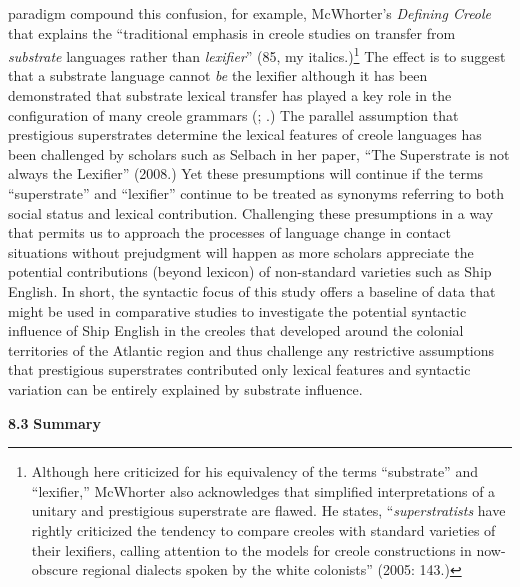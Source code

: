paradigm compound this confusion, for example, McWhorter’s \textit{Defining Creole}  that explains the “traditional emphasis in creole studies on transfer from \textit{substrate} languages rather than \textit{lexifier}” (85, my italics.)\footnote{Although here criticized for his equivalency of the terms “substrate” and “lexifier,” McWhorter also acknowledges that simplified interpretations of a unitary and prestigious superstrate are flawed. He states, “\textit{superstratists} have rightly criticized the tendency to compare creoles with standard varieties of their lexifiers, calling attention to the models for creole constructions in now-obscure regional dialects spoken by the white colonists” (2005: 143.)}  The effect is to suggest that a substrate language cannot \textit{be} the lexifier although it has been demonstrated that substrate lexical transfer has played a key role in the configuration of many creole grammars (\citealt{Kihm1989}; \citealt{Migge1998}.) The parallel assumption that prestigious superstrates determine the lexical features of creole languages has been challenged by scholars such as Selbach in her paper, “The Superstrate is not always the Lexifier” (2008.) Yet these presumptions will continue if the terms “superstrate” and “lexifier” continue to be treated as synonyms referring to both social status and lexical contribution. Challenging these presumptions in a way that permits us to approach the processes of language change in contact situations without prejudgment will happen as more scholars appreciate the potential contributions (beyond lexicon) of non-standard varieties such as Ship English. In short, the syntactic focus of this study offers a baseline of data that might be used in comparative studies to investigate the potential syntactic influence of Ship English in the creoles that developed around the colonial territories of the Atlantic region and thus challenge any restrictive assumptions that prestigious superstrates contributed only lexical features and syntactic variation can be entirely explained by substrate influence. 

\textbf{8.3} \textbf{Summary}


